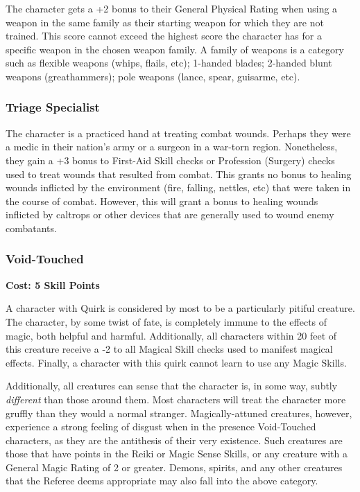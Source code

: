 \documentclass[oneside]{book}
\begin{document}
\begin{multicols}{2}
The character gets a +2 bonus to their General Physical Rating when using a weapon in the same family as their starting weapon for which they are not trained. This score cannot exceed the highest score the character has for a specific weapon in the chosen weapon family. A family of weapons is a category such as flexible weapons (whips, flails, etc); 1-handed blades; 2-handed blunt weapons (greathammers); pole weapons (lance, spear, guisarme, etc).

\subsubsection{Triage Specialist}
The character is a practiced hand at treating combat wounds. Perhaps they were a medic in their nation's army or a surgeon in a war-torn region. Nonetheless, they gain a +3 bonus to First-Aid Skill checks or Profession (Surgery) checks used to treat wounds that resulted from combat. This grants no bonus to healing wounds inflicted by the environment (fire, falling, nettles, etc) that were taken in the course of combat. However, this will grant a bonus to healing wounds inflicted by caltrops or other devices that are generally used to wound enemy combatants.

\subsubsection{Void-Touched}
\textbf{\small Cost: 5 Skill Points}

A character with Quirk is considered by most to be a particularly pitiful creature. The character, by some twist of fate, is completely immune to the effects of magic, both helpful and harmful. Additionally, all characters within 20 feet of this creature receive a -2 to all Magical Skill checks used to manifest magical effects. Finally, a character with this quirk cannot learn to use any Magic Skills.

Additionally, all creatures can sense that the character is, in some way, subtly \emph{different} than those around them. Most characters will treat the character more gruffly than they would a normal stranger. Magically-attuned creatures, however, experience a strong feeling of disgust when in the presence Void-Touched characters, as they are the antithesis of their very existence. Such creatures are those that have points in the Reiki or Magic Sense Skills, or any creature with a General Magic Rating of 2 or greater. Demons, spirits, and any other creatures that the Referee deems appropriate may also fall into the above category.
\end{multicols}
\end{document}
